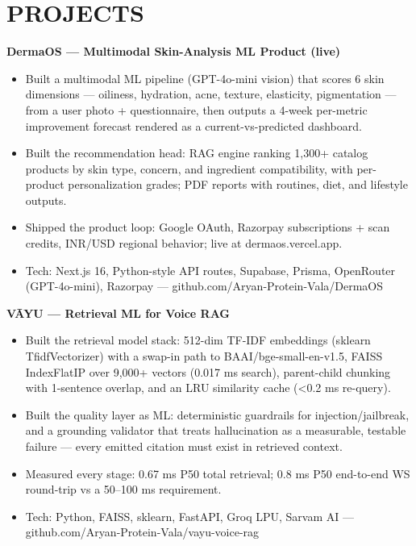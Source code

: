 \documentclass[9pt]{article}
\begin{document}
\section*{PROJECTS}
\textbf{DermaOS  ---  Multimodal Skin-Analysis ML Product (live)}
\vspace{1pt}
\begin{itemize}[leftmargin=11pt,itemsep=0pt,topsep=1pt,parsep=0pt]
\item Built a multimodal ML pipeline (GPT-4o-mini vision) that scores 6 skin dimensions  ---  oiliness, hydration, acne, texture, elasticity, pigmentation  ---  from a user photo + questionnaire, then outputs a 4-week per-metric improvement forecast rendered as a current-vs-predicted dashboard.
\item Built the recommendation head: RAG engine ranking 1,300+ catalog products by skin type, concern, and ingredient compatibility, with per-product personalization grades; PDF reports with routines, diet, and lifestyle outputs.
\item Shipped the product loop: Google OAuth, Razorpay subscriptions + scan credits, INR/USD regional behavior; live at dermaos.vercel.app.
\item Tech: Next.js 16, Python-style API routes, Supabase, Prisma, OpenRouter (GPT-4o-mini), Razorpay  ---  github.com/Aryan-Protein-Vala/DermaOS
\end{itemize}
\textbf{VĀYU  ---  Retrieval ML for Voice RAG}
\vspace{1pt}
\begin{itemize}[leftmargin=11pt,itemsep=0pt,topsep=1pt,parsep=0pt]
\item Built the retrieval model stack: 512-dim TF-IDF embeddings (sklearn TfidfVectorizer) with a swap-in path to BAAI/bge-small-en-v1.5, FAISS IndexFlatIP over 9,000+ vectors (0.017 ms search), parent-child chunking with 1-sentence overlap, and an LRU similarity cache (<0.2 ms re-query).
\item Built the quality layer as ML: deterministic guardrails for injection/jailbreak, and a grounding validator that treats hallucination as a measurable, testable failure  ---  every emitted citation must exist in retrieved context.
\item Measured every stage: 0.67 ms P50 total retrieval; 0.8 ms P50 end-to-end WS round-trip vs a 50–100 ms requirement.
\item Tech: Python, FAISS, sklearn, FastAPI, Groq LPU, Sarvam AI  ---  github.com/Aryan-Protein-Vala/vayu-voice-rag
\end{itemize}
\end{document}
